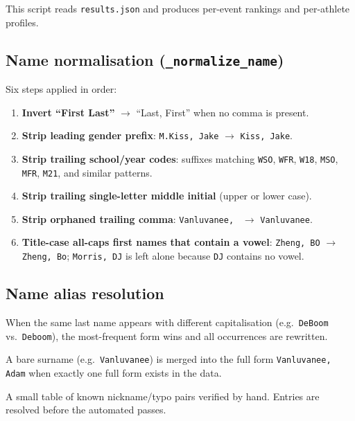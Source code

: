 \documentclass{article}
\begin{document}
This script reads \texttt{results.json} and produces per-event rankings and
per-athlete profiles.

\subsection{Name normalisation (\texttt{\_normalize\_name})}

Six steps applied in order:

\begin{enumerate}[noitemsep]
  \item \textbf{Invert ``First Last''} $\to$ ``Last, First'' when no comma is
        present.
  \item \textbf{Strip leading gender prefix}: \texttt{M.Kiss, Jake}
        $\to$ \texttt{Kiss, Jake}.
  \item \textbf{Strip trailing school/year codes}: suffixes matching
        \texttt{WSO}, \texttt{WFR}, \texttt{W18}, \texttt{MSO}, \texttt{MFR},
        \texttt{M21}, and similar patterns.
  \item \textbf{Strip trailing single-letter middle initial} (upper or lower
        case).
  \item \textbf{Strip orphaned trailing comma}: \texttt{Vanluvanee, }
        $\to$ \texttt{Vanluvanee}.
  \item \textbf{Title-case all-caps first names that contain a vowel}:
        \texttt{Zheng, BO} $\to$ \texttt{Zheng, Bo};
        \texttt{Morris, DJ} is left alone because \texttt{DJ} contains no
        vowel.
\end{enumerate}

\subsection{Name alias resolution}

\begin{description}[noitemsep]
  \item[Case-variant resolution.]
    When the same last name appears with different capitalisation
    (e.g.\ \texttt{DeBoom} vs.\ \texttt{Deboom}), the most-frequent form wins
    and all occurrences are rewritten.

  \item[Last-name-only merging.]
    A bare surname (e.g.\ \texttt{Vanluvanee}) is merged into the full form
    \texttt{Vanluvanee, Adam} when exactly one full form exists in the data.

  \item[Manual aliases.]
    A small table of known nickname/typo pairs verified by hand. Entries are
    resolved before the automated passes.
\end{description}
\end{document}
